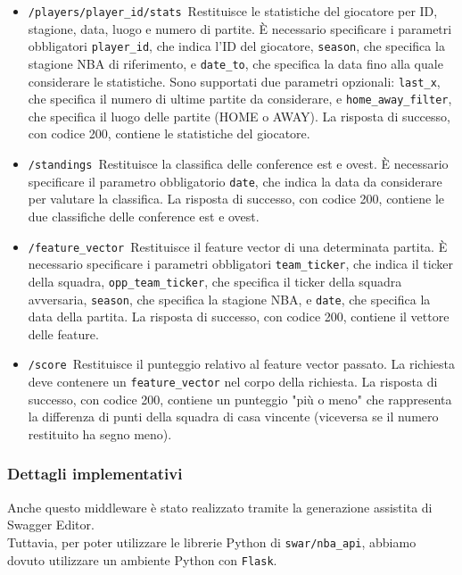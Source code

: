 \begin{itemize}
    \item \texttt{/players/{player\_id}/stats}\
    Restituisce le statistiche del giocatore per ID, stagione, data, luogo e numero di partite. È necessario specificare i parametri obbligatori \texttt{player\_id}, che indica l'ID del giocatore, \texttt{season}, che specifica la stagione NBA di riferimento, e \texttt{date\_to}, che specifica la data fino alla quale considerare le statistiche. Sono supportati due parametri opzionali: \texttt{last\_x}, che specifica il numero di ultime partite da considerare, e \texttt{home\_away\_filter}, che specifica il luogo delle partite (HOME o AWAY). La risposta di successo, con codice 200, contiene le statistiche del giocatore.
    \item \texttt{/standings}\
    Restituisce la classifica delle conference est e ovest. È necessario specificare il parametro obbligatorio \texttt{date}, che indica la data da considerare per valutare la classifica. La risposta di successo, con codice 200, contiene le due classifiche delle conference est e ovest.
    \item \texttt{/feature\_vector}\
    Restituisce il feature vector di una determinata partita. È necessario specificare i parametri obbligatori \texttt{team\_ticker}, che indica il ticker della squadra, \texttt{opp\_team\_ticker}, che specifica il ticker della squadra avversaria, \texttt{season}, che specifica la stagione NBA, e \texttt{date}, che specifica la data della partita. La risposta di successo, con codice 200, contiene il vettore delle feature.
    \item \texttt{/score}\
    Restituisce il punteggio relativo al feature vector passato. La richiesta deve contenere un \texttt{feature\_vector} nel corpo della richiesta. La risposta di successo, con codice 200, contiene un punteggio "più o meno" che rappresenta la differenza di punti della squadra di casa vincente (viceversa se il numero restituito ha segno meno).
\end{itemize}


\subsubsection{Dettagli implementativi}
Anche questo middleware è stato realizzato tramite la generazione assistita di Swagger Editor.\\
Tuttavia, per poter utilizzare le librerie Python di \texttt{swar/nba\_api}, abbiamo dovuto utilizzare un ambiente Python con \texttt{Flask}. 


